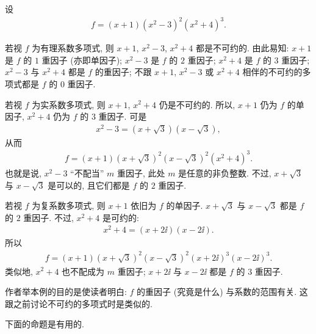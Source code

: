 \begin{example}
    设
    \begin{align*}
        f = (x + 1) (x^2 - 3)^2 (x^2 + 4)^3.
    \end{align*}

    若视 $f$ 为有理系数多项式, 则 $x+1$, $x^2 - 3$, $x^2 + 4$ 都是不可约的. 由此易知: $x+1$ 是 $f$ 的 $1$ 重因子 (亦即单因子); $x^2 - 3$ 是 $f$ 的 $2$ 重因子; $x^2 + 4$ 是 $f$ 的 $3$ 重因子; $x^2 - 3$ 与 $x^2 + 4$ 都是 $f$ 的重因子; 不跟 $x+1$, $x^2 - 3$ 或 $x^2 + 4$ 相伴的不可约的多项式都是 $f$ 的 $0$ 重因子.

    若视 $f$ 为实系数多项式, 则 $x+1$, $x^2+4$ 仍是不可约的. 所以, $x+1$ 仍为 $f$ 的单因子, $x^2+4$ 仍为 $f$ 的 $3$ 重因子. 可是
    \begin{align*}
        x^2 - 3 = (x + \sqrt{3}) (x - \sqrt{3}),
    \end{align*}
    从而
    \begin{align*}
        f = (x + 1)(x + \sqrt{3})^2 (x - \sqrt{3})^2 (x^2 + 4)^3.
    \end{align*}
    也就是说, $x^2 - 3$ ``不配当'' $m$ 重因子, 此处 $m$ 是任意的非负整数. 不过, $x + \sqrt{3}$ 与 $x - \sqrt{3}$ 是可以的, 且它们都是 $f$ 的 $2$ 重因子.

    若视 $f$ 为复系数多项式, 则 $x+1$ 依旧为 $f$ 的单因子. $x + \sqrt{3}$ 与 $x - \sqrt{3}$ 都是 $f$ 的 $2$ 重因子. 不过, $x^2 + 4$ 是可约的:
    \begin{align*}
        x^2 + 4 = (x + 2\ii) (x - 2\ii).
    \end{align*}
    所以
    \begin{align*}
        f = (x + 1)(x + \sqrt{3})^2 (x - \sqrt{3})^2 (x + 2\ii)^3 (x - 2\ii)^3.
    \end{align*}
    类似地, $x^2 + 4$ 也不配成为 $m$ 重因子; $x + 2\ii$ 与 $x - 2\ii$ 都是 $f$ 的 $3$ 重因子.

    作者举本例的目的是使读者明白: $f$ 的重因子 (究竟是什么) 与系数的范围有关. 这跟之前讨论不可约的多项式时是类似的.
\end{example}

下面的命题是有用的.

